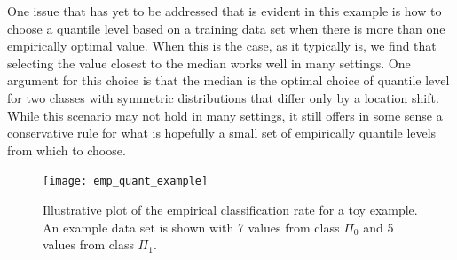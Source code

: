 One issue that has yet to be addressed that is evident in this example is how to
choose a quantile level based on a training data set when there is more than one
empirically optimal value.  When this is the case, as it typically is, we find
that selecting the value closest to the median works well in many settings.  One
argument for this choice is that the median is the optimal choice of quantile
level for two classes with symmetric distributions that differ only by a
location shift.  While this scenario may not hold in many settings, it still
offers in some sense a conservative rule for what is hopefully a small set of
empirically quantile levels from which to choose.

\begin{figure}[p]
  \caption[Example empirical classification rate]{Illustrative plot of the
    empirical classification rate for a toy example.  An example data set is
    shown with 7 values from class $\Pi_0$ and 5 values from class $\Pi_1$. }
  \label{fig:empirical-classification-rate}
  \centering
  \vspace{5mm}

  \texttt{[image: emp\_quant\_example]}
\end{figure}




